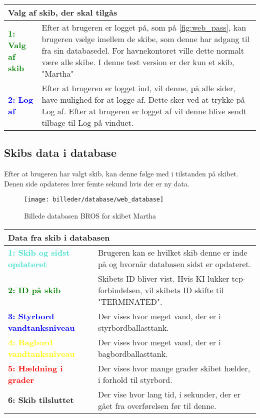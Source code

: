 \begin{table}[H]
\begin{tabular}{l p{12.5cm}}
\multicolumn{2}{l}{Valg af skib, der skal tilgås } \\
\hline
\textcolor{green}{\textbf{1: Valg af skib}}
&Efter at brugeren er logget på, som på \ref{fig:web_pass}, kan brugeren vælge imellem de skibe, som denne har adgang til fra sin databasedel. For havnekontoret ville dette normalt være alle skibe. I denne test version er der kun et skib, "Martha"\\
\textcolor{blue}{\textbf{2: Log af}}
&Efter at brugeren er logget ind, vil denne, på alle sider, have mulighed for at logge af. Dette sker ved at trykke på Log af. Efter at brugeren er logget af vil denne blive sendt tilbage til Log på vinduet.\\
\end{tabular}
\end{table}

\subsection*{Skibs data i database}
Efter at brugeren har valgt skib, kan denne følge med i tilstanden på skibet. Denen side opdateres hver femte sekund hvis der er ny data.
\begin{figure}[H]
	\centering
	\texttt{[image: billeder/database/web\_database]}
	\caption{Billede databasen BROS for skibet Martha}
	\label{fig:web_database}
\end{figure}
\begin{table}[H]
\begin{tabular}{l  p{9.3cm}}

\multicolumn{2}{l}{Data fra skib i databasen } \\
\hline
\textcolor{Turquoise}{\textbf{1: Skib og sidst opdateret}}
&Brugeren kan se hvilket skib denne er inde på og hvornår databasen sidst er opdateret.\\
\textcolor{green}{\textbf{2: ID på skib}}
&Skibets ID bliver vist. Hvis KI lukker tcp-forbindelsen, vil skibets ID skifte til "TERMINATED".\\
\textcolor{blue}{\textbf{3: Styrbord vandtanksniveau}}
&Der vises hvor meget vand, der er i styrbordballasttank.\\
\textcolor{yellow}{\textbf{4: Bagbord vandtanksniveau}}
&Der vises hvor meget vand, der er i bagbordballasttank.\\
\textcolor{red}{\textbf{5: Hældning i grader}}
&Der vises hvor mange grader skibet hælder, i forhold til styrbord.\\
\textcolor{RoyalPurple}{\textbf{6: Skib tilsluttet}}
&Der vise hvor lang tid, i sekunder, der er gået fra overførelsen før til denne.\\
\end{tabular}
\end{table}

